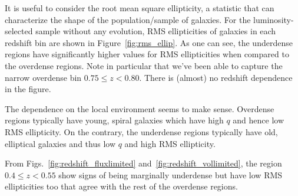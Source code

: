 \documentclass[twocolumn,useAMS,usenatbib]{mn2e}
\begin{document}
It is useful to consider the root mean square ellipticity, a statistic that can characterize the shape of the population/sample of galaxies.
For the luminosity-selected sample without any evolution, RMS ellipticities of galaxies in each redshift bin are shown in Figure~\ref{fig:rms_ellip}. As one can see, the underdense regions
have significantly higher values for RMS ellipticities when compared to the overdense regions. Note in particular that we've been able to capture the narrow overdense bin $0.75\le z < 0.80$.  
There is (almost) no redshift dependence in the figure.

The dependence on the local environment seems to make sense. Overdense regions typically have young, spiral galaxies which have high $q$ and hence low RMS ellipticity. 
On the contrary, the underdense regions typically have old, elliptical galaxies and thus low $q$ and high RMS ellipticity.

From Figs.~\ref{fig:redshift_fluxlimited} and~\ref{fig:redshift_vollimited},
the region $0.4\le z < 0.55$ show signs of being marginally underdense but have low RMS ellipticities too that agree with the rest of the overdense regions.
\end{document}
